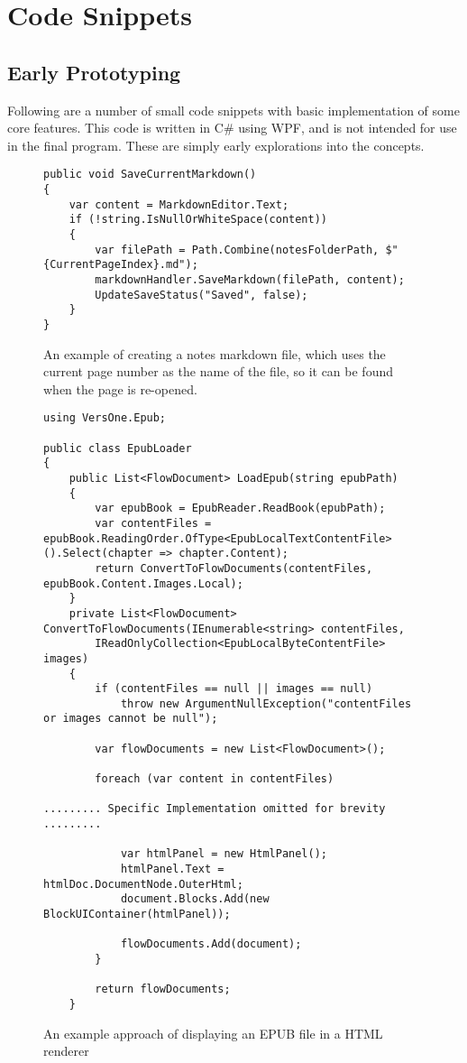 \chapter{Code Snippets}

\section{Early Prototyping}
Following are a number of small code snippets with basic implementation of some core features. This code is written in C\# using WPF, and is not intended for use in the final program. These are simply early explorations into the concepts. 
\newpage

\begin{figure}
    \centering
    \begin{lstlisting}
public void SaveCurrentMarkdown()
{
    var content = MarkdownEditor.Text;
    if (!string.IsNullOrWhiteSpace(content))
    {
        var filePath = Path.Combine(notesFolderPath, $"{CurrentPageIndex}.md");
        markdownHandler.SaveMarkdown(filePath, content);
        UpdateSaveStatus("Saved", false);
    }
}
    \end{lstlisting}
    \caption{An example of creating a notes markdown file, which uses the current page number as the name of the file, so it can be found when the page is re-opened. }
    \label{SaveCurrentMarkdown}
\end{figure}

\begin{figure}
    \centering
    \begin{lstlisting}
using VersOne.Epub;

public class EpubLoader
{
	public List<FlowDocument> LoadEpub(string epubPath)
	{
		var epubBook = EpubReader.ReadBook(epubPath);
		var contentFiles = epubBook.ReadingOrder.OfType<EpubLocalTextContentFile>().Select(chapter => chapter.Content);
		return ConvertToFlowDocuments(contentFiles, epubBook.Content.Images.Local);
	}
    private List<FlowDocument> ConvertToFlowDocuments(IEnumerable<string> contentFiles,
		IReadOnlyCollection<EpubLocalByteContentFile> images)
	{
		if (contentFiles == null || images == null)
			throw new ArgumentNullException("contentFiles or images cannot be null");

		var flowDocuments = new List<FlowDocument>();

		foreach (var content in contentFiles)
        
......... Specific Implementation omitted for brevity .........

			var htmlPanel = new HtmlPanel();
			htmlPanel.Text = htmlDoc.DocumentNode.OuterHtml;
			document.Blocks.Add(new BlockUIContainer(htmlPanel));

			flowDocuments.Add(document);
		}

		return flowDocuments;
	}
    \end{lstlisting}
    \caption{An example approach of displaying an EPUB file in a HTML renderer}
    \label{EPUB to HTML}
\end{figure}